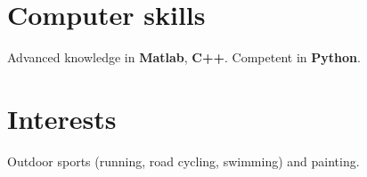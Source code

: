 \documentclass[11pt,a4paper,sans]{moderncv}        %
\begin{document}

\section{Computer skills}
Advanced knowledge in \textbf{Matlab}, \textbf{C++}. Competent in \textbf{Python}.

\section{Interests}
Outdoor sports (running, road cycling, swimming) and painting.



\nocite{*}


\end{document}
